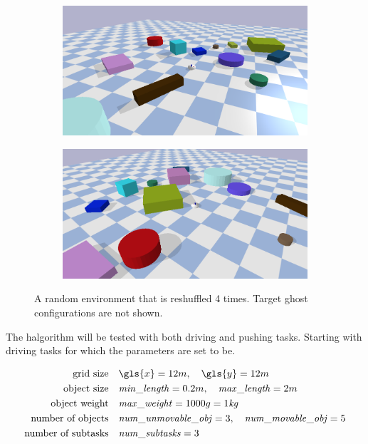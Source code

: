 \begin{figure}[H]
    \vspace{0.2cm}
    \begin{subfigure}{.49\textwidth}
    \includegraphics[width=\textwidth]{figures/results/random3}
    \end{subfigure}
    \hfill
    \begin{subfigure}{.49\textwidth}
    \centering
    \includegraphics[width=\textwidth]{figures/results/random4}
    \end{subfigure}
    \caption{A random environment that is reshuffled 4 times. Target ghost configurations are not shown.}
    \label{fig:random_environment_reshuffle}
\end{figure}

The \ac{halgorithm} will be tested with both driving and pushing tasks. Starting with driving tasks for which the parameters are set to be.\bs

\begin{center}
\begin{align*}
\text{grid size} \quad &\gls{x}=12 m, \quad \gls{y}=12 m \\
\text{object size} \quad &\mathit{min\_length}=0.2 m, \quad \mathit{max\_length}=2 m \\
\text{object weight} \quad &\mathit{max\_weight}=1000 g = 1 \mathit{kg}\\
\text{number of objects} \quad &\mathit{num\_unmovable\_obj}=3, \quad \mathit{num\_movable\_obj}=5 \\
\text{number of subtasks} \quad &\mathit{num\_subtasks}=3
\end{align*}
\end{center}

